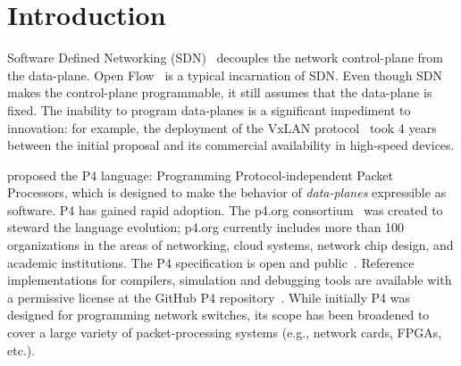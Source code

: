  \section{Introduction}\label{sec:introduction}

Software Defined Networking (SDN)~\cite{rfc7426} decouples the network
control-plane from the data-plane.  Open Flow~\cite{mckeown-ccr08} is
a typical incarnation of SDN.  Even though SDN makes the control-plane
programmable, it still assumes that the {data-plane} is fixed.  The
inability to program data-planes is a significant impediment to
innovation: for example, the deployment of the VxLAN
protocol~\cite{rfc7348} took 4 years between the initial proposal and
its commercial availability in high-speed devices.

\cite{bosshart-ccr14} proposed the P4 language: Programming
Protocol-independent Packet Processors, which is designed to make the
behavior of \emph{data-planes} expressible as software.  P4 has gained
rapid adoption.  The p4.org consortium~\cite{p4org} was created to
steward the language evolution; p4.org currently includes more than
100 organizations in the areas of networking, cloud systems, network
chip design, and academic institutions.  The P4 specification is open
and public~\cite{p416-spec17}.  Reference implementations for
compilers, simulation and debugging tools are available with a
permissive license at the GitHub P4 repository~\cite{p4lang}.  While
initially P4 was designed for programming network switches, its scope
has been broadened to cover a large variety of packet-processing
systems (e.g., network cards, FPGAs, etc.).
